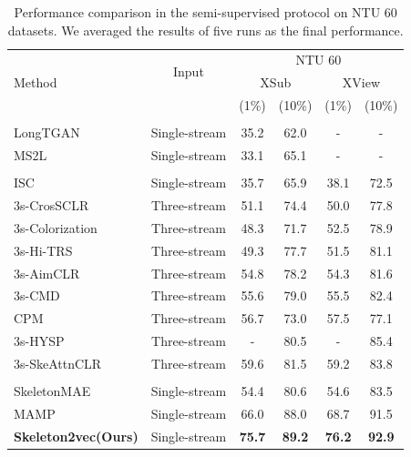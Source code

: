 \begin{table}[tb]
    \caption{
      Performance comparison in the semi-supervised protocol on NTU 60 datasets.
      We averaged the results of five runs as the final performance.
    }
    \centering
    \setlength{\tabcolsep}{4pt} %
    \begin{tabular}{l c c c c c}
      \toprule
      \multirow{3}{*}{Method} &
      \multirow{2}{*}{Input} &
      \multicolumn{4}{c}{NTU 60} \\
      & & \multicolumn{2}{c}{XSub} & \multicolumn{2}{c}{XView} \\
      & & (1\%) & (10\%) & (1\%) & (10\%) \\
      \midrule
      \rowcolor{Gray!20} \multicolumn{6}{l}{\textit{Other pretext tasks:}} \\
      LongTGAN \cite{zheng2018unsupervised} & Single-stream & 35.2 & 62.0 & - & - \\
      MS2L \cite{lin2020ms2l} & Single-stream & 33.1 & 65.1 & - & - \\
      \rowcolor{Gray!20} \multicolumn{6}{l}{\textit{Contrastive Learning:}} \\
      ISC \cite{thoker2021skeleton} & Single-stream & 35.7 & 65.9 & 38.1 & 72.5 \\
      3s-CrosSCLR \cite{li20213d} & Three-stream & 51.1 & 74.4 & 50.0 & 77.8 \\
      3s-Colorization \cite{yang2021skeleton} & Three-stream & 48.3 & 71.7 & 52.5 & 78.9 \\
      3s-Hi-TRS \cite{chen2022hierarchically} & Three-stream & 49.3 & 77.7 & 51.5 & 81.1 \\
      3s-AimCLR \cite{guo2022contrastive} & Three-stream & 54.8 & 78.2 & 54.3 & 81.6 \\
      3s-CMD \cite{mao2022cmd} & Three-stream & 55.6 & 79.0 & 55.5 & 82.4 \\
      CPM \cite{zhang2022contrastive} & Three-stream & 56.7 & 73.0 & 57.5 & 77.1 \\
      3s-HYSP \cite{franco2023hyperbolic} & Three-stream & - & 80.5 & - & 85.4 \\
      3s-SkeAttnCLR \cite{Hua2023SkeAttnCLR} & Three-stream & 59.6 & 81.5 & 59.2 & 83.8 \\
      \rowcolor{Gray!20} \multicolumn{6}{l}{\textit{Masked Prediction:}} \\
      SkeletonMAE \cite{wu2023skeletonmae}& Single-stream  & 54.4 & 80.6 & 54.6 & 83.5 \\
      MAMP \cite{mao2023masked} & Single-stream & 66.0 & 88.0 & 68.7 & 91.5 \\
      \midrule
      \textbf{Skeleton2vec(Ours)} & Single-stream & \textbf{75.7} & \textbf{89.2} & \textbf{76.2} & \textbf{92.9} \\
      \bottomrule
    \end{tabular}
    \label{tab:semi-supervised}
\end{table}

